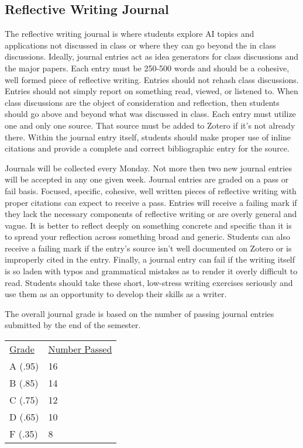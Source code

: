 \documentclass[]{tufte-handout}
\begin{document}
\subsection{Reflective Writing Journal}

The reflective writing journal is where students explore AI topics and applications not discussed in class or where they can go beyond the in class discussions. Ideally, journal entries act as idea generators for class discussions and the major papers. Each entry must be 250-500 words and should be a cohesive, well formed piece of reflective writing. Entries should not rehash class discussions. Entries should not simply report on something read, viewed, or listened to. When class discussions are the object of consideration and reflection, then students should go above and beyond what was discussed in class. Each entry must utilize one and only one source. That source must be added to Zotero if it's not already there. Within the journal entry itself, students should make proper use of inline citations and provide a complete and correct bibliographic entry for the source. 

Journals will be collected every Monday. Not more then two new journal entries will be accepted in any one given week. Journal entries are graded on a pass or fail basis. Focused, specific, cohesive, well written pieces of reflective writing with proper citations can expect to receive a pass. Entries will receive a failing mark if they lack the necessary components of reflective writing or are overly general and vague. It is better to reflect deeply on something concrete and specific than it is to spread your reflection across something broad and generic. Students can also receive a failing mark if the entry's source isn't well documented on Zotero or is improperly cited in the entry. Finally, a journal entry can fail if the writing itself is so laden with typos and grammatical mistakes as to render it overly difficult to read.  Students should take these short, low-stress writing exercises seriously and use them as an opportunity to develop their skills as a writer. 

The overall journal grade is based on the number of passing journal entries submitted by the end of the semester. 

\begin{center}
\begin{tabular}{ll}
\underline{Grade} & \underline{Number Passed} \\
A (.95) & 16 \\
B (.85) & 14 \\
C (.75) & 12 \\
D (.65) & 10\\
F (.35) & 8 \\
\end{tabular}
\end{center}
\end{document}
